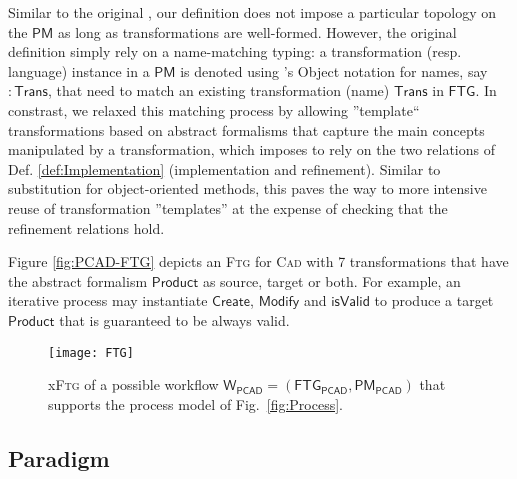 Similar to the original  
\cite{Mustafiz-etAl:2012,Lucio-Mustafiz-etAl:2013,TR:Lucio-Mustafiz-etAl:2012},
our definition does not impose a particular topology on the $\mathsf{PM}$ as 
long as transformations are well-formed. However, the original definition 
simply rely on a name-matching typing: a transformation (resp. language) 
instance in a $\mathsf{PM}$ is denoted using \UML's Object notation for names, 
say $\mathsf{:Trans}$, that need to match an existing transformation (name) 
$\mathsf{Trans}$ in $\mathsf{FTG}$. In constrast, we relaxed this matching 
process by allowing ''template`` transformations based on abstract formalisms 
that capture the main concepts manipulated by a transformation, which imposes 
to rely on the two relations of Def. \ref{def:Implementation} (implementation 
and refinement). Similar to substitution for object-oriented methods, this 
paves the way to more intensive reuse of transformation ''templates'' at the 
expense of checking that the refinement relations hold.

\begin{Example}
   Figure \ref{fig:PCAD-FTG} depicts an \textsc{Ftg} for \textsc{Cad} with 7 
transformations that have the abstract formalism $\mathsf{Product}$ as source, 
target or both. For example, an iterative process may instantiate 
$\mathsf{Create}$, $\mathsf{Modify}$ and $\mathsf{isValid}$ to produce a target 
$\mathsf{Product}$ that is guaranteed to be always valid.  


\begin{figure}[t]
   \centering
   \texttt{[image: FTG]}
   \caption{x\textsc{Ftg} of a possible workflow $\mathsf{W_{PCAD}} = (\mathsf{FTG_{PCAD}}, 
\mathsf{PM_{PCAD}})$ that supports the process model of Fig.~\ref{fig:Process}.}%
   \label{fig:PCAD-MM}%
\end{figure}

\end{Example}

\subsection{Paradigm}
\label{sec:PS}

